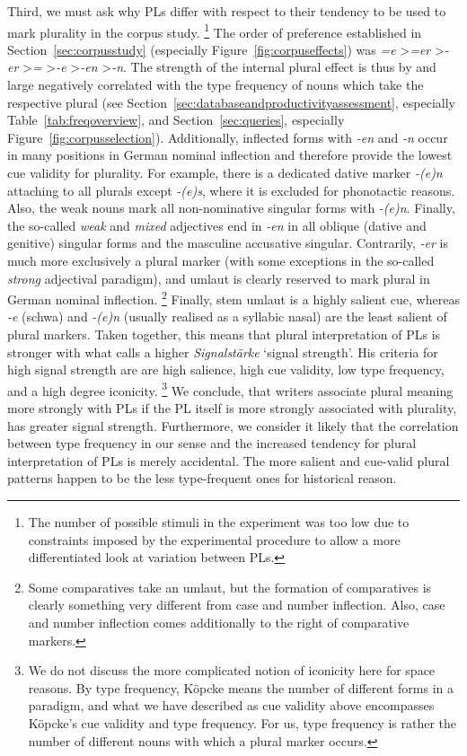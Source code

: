 Third, we must ask why PLs differ with respect to their tendency to be used to mark plurality in the corpus study.%
\footnote{The number of possible stimuli in the experiment was too low due to constraints imposed by the experimental procedure to allow a more differentiated look at variation between PLs.}
The order of preference established in Section~\ref{sec:corpusstudy} (especially Figure~\ref{fig:corpuseffects}) was \textit{=e} \textgreater \textit{=er} \textgreater \textit{-er} \textgreater \textit{=} \textgreater \textit{-e} \textgreater \textit{-en} \textgreater \textit{-n}.
The strength of the internal plural effect is thus by and large negatively correlated with the type frequency of nouns which take the respective plural (see Section~\ref{sec:databaseandproductivityassessment}, especially Table~\ref{tab:freqoverview}, and Section~\ref{sec:queries}, especially Figure~\ref{fig:corpusselection}).
Additionally, inflected forms with \textit{-en} and \textit{-n} occur in many positions in German nominal inflection and therefore provide the lowest cue validity for plurality.
For example, there is a dedicated dative marker \textit{-(e)n} attaching to all plurals except \textit{-(e)s}, where it is excluded for phonotactic reasons.
Also, the weak nouns mark all non-nominative singular forms with \textit{-(e)n}.
Finally, the so-called \textit{weak} and \textit{mixed} adjectives end in \textit{-en} in all oblique (dative and genitive) singular forms and the masculine accusative singular.
Contrarily, \textit{-er} is much more exclusively a plural marker (with some exceptions in the so-called \textit{strong} adjectival paradigm), and umlaut is clearly reserved to mark plural in German nominal inflection.%
\footnote{Some comparatives take an umlaut, but the formation of comparatives is clearly something very different from case and number inflection.
Also, case and number inflection comes additionally to the right of comparative markers.}
Finally, stem umlaut is a highly salient cue, whereas \textit{-e} (schwa) and \textit{-(e)n} (usually realised as a syllabic nasal) are the least salient of plural markers.
Taken together, this means that plural interpretation of PLs is stronger with what \textcite{Koepcke1993} calls a higher \textit{Signalstärke} `signal strength'.
His criteria for high signal strength are are high salience, high cue validity, low type frequency, and a high degree  iconicity.%
\footnote{We do not discuss the more complicated notion of iconicity here for space reasons.
By type frequency, Köpcke means the number of different forms in a paradigm, and what we have described as cue validity above encompasses Köpcke's cue validity and type frequency.
For us, type frequency is rather the number of different nouns with which a plural marker occurs.}
We conclude, that writers associate plural meaning more strongly with PLs if the PL itself is more strongly associated with plurality, \ie has greater signal strength.
Furthermore, we consider it likely that the correlation between type frequency in our sense and the increased tendency for plural interpretation of PLs is merely accidental.
The more salient and cue-valid plural patterns happen to be the less type-frequent ones for historical reason.

